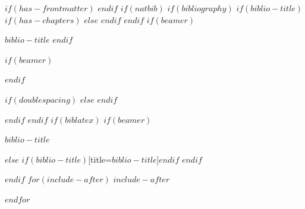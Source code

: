 \documentclass[
$if(fontsize)$
  $fontsize$,
$endif$
$if(lang)$
  $babel-lang$,
$endif$
$if(papersize)$
  $papersize$paper,
$endif$
$if(beamer)$
  ignorenonframetext,
$if(handout)$
  handout,
$endif$
$if(aspectratio)$
  aspectratio=$aspectratio$,
$endif$
$endif$
$for(classoption)$
  $classoption$$sep$,
$endfor$
]{$documentclass$}
\newif\ifbibliography
\begin{document}
$if(has-frontmatter)$
\backmatter
$endif$
$if(natbib)$
$if(bibliography)$
$if(biblio-title)$
$if(has-chapters)$
\renewcommand\bibname{$biblio-title$}
$else$
\renewcommand\refname{$biblio-title$}
$endif$
$endif$
$if(beamer)$
\begin{frame}[allowframebreaks]{$biblio-title$}
  \bibliographytrue
$endif$
  
$if(beamer)$
\end{frame}
$endif$


$if(doublespacing)$
\singlespacing
$else$
$endif$

$endif$
$endif$
$if(biblatex)$
$if(beamer)$
\begin{frame}[allowframebreaks]{$biblio-title$}
  \bibliographytrue
  \printbibliography[heading=none]
\end{frame}
$else$
\printbibliography$if(biblio-title)$[title=$biblio-title$]$endif$
$endif$

$endif$
$for(include-after)$
$include-after$

$endfor$
\end{document}
